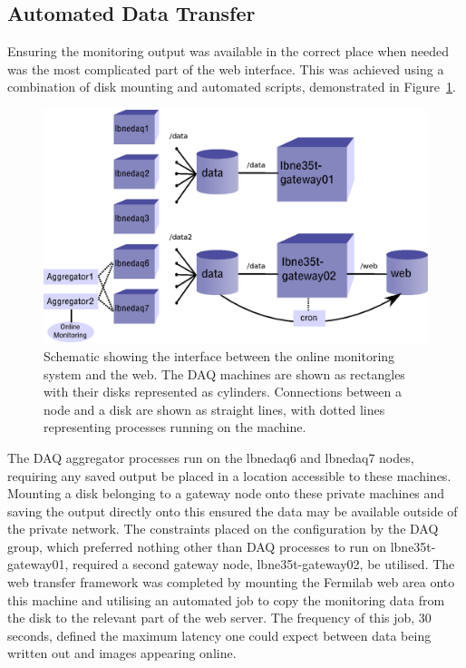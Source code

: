 \subsection{Automated Data Transfer}\label{sec:AutomatedDataTransfer}

Ensuring the monitoring output was available in the correct place when needed was the most complicated part of the web interface.  This was achieved using a combination of disk mounting and automated scripts, demonstrated in Figure~\ref{fig:WebInterface}.

\begin{figure}
  \centering
  \includegraphics[width=12cm]{webInterface.eps}
  \caption[Schematic showing the interface between the online monitoring system and the web.]{Schematic showing the interface between the online monitoring system and the web.  The DAQ machines are shown as rectangles with their disks represented as cylinders.  Connections between a node and a disk are shown as straight lines, with dotted lines representing processes running on the machine.}
  \label{fig:WebInterface}
\end{figure}

The DAQ aggregator processes run on the lbnedaq6 and lbnedaq7 nodes, requiring any saved output be placed in a location accessible to these machines.  Mounting a disk belonging to a gateway node onto these private machines and saving the output directly onto this ensured the data may be available outside of the private network.  The constraints placed on the configuration by the DAQ group, which preferred nothing other than DAQ processes to run on lbne35t-gateway01, required a second gateway node, lbne35t-gateway02, be utilised.  The web transfer framework was completed by mounting the Fermilab web area onto this machine and utilising an automated job to copy the monitoring data from the disk to the relevant part of the web server.  The frequency of this job, 30 seconds, defined the maximum latency one could expect between data being written out and images appearing online.

